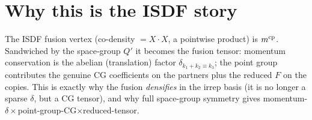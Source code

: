 \documentclass[11pt]{article}
\theoremstyle{plain}\newtheorem*{thm}{Theorem}\newtheorem*{lem}{Lemma}
\begin{document}
\section{Why this is the ISDF story}
The ISDF fusion vertex (co-density $=X\!\cdot\!X$, a pointwise product) is $m^{\rm cp}$. Sandwiched by
the space-group $Q'$ it becomes the fusion tensor: momentum conservation is the abelian (translation)
factor $\delta_{k_1+k_2\equiv k_3}$; the point group contributes the genuine CG coefficients on the
partners plus the reduced $F$ on the copies. This is exactly why the fusion \emph{densifies} in the
irrep basis (it is no longer a sparse $\delta$, but a CG tensor), and why full space-group symmetry
gives momentum-$\delta\times$point-group-CG$\times$reduced-tensor.
\end{document}
